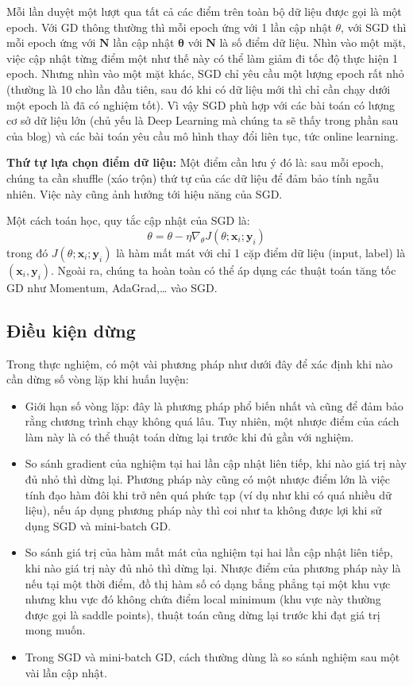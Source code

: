 Mỗi lần duyệt một lượt qua tất cả các điểm trên toàn bộ dữ liệu được gọi là một epoch. Với GD thông thường thì mỗi epoch ứng với 1 lần cập nhật $\theta$, với SGD thì mỗi epoch ứng với $\mathbf{N}$ lần cập nhật $\mathbf{\theta}$ với $\mathbf{N}$ là số điểm dữ liệu. Nhìn vào một mặt, việc cập nhật từng điểm một như thế này có thể làm giảm đi tốc độ thực hiện 1 epoch. Nhưng nhìn vào một mặt khác, SGD chỉ yêu cầu một lượng epoch rất nhỏ (thường là 10 cho lần đầu tiên, sau đó khi có dữ liệu mới thì chỉ cần chạy dưới một epoch là đã có nghiệm tốt). Vì vậy SGD phù hợp với các bài toán có lượng cơ sở dữ liệu lớn (chủ yếu là Deep Learning mà chúng ta sẽ thấy trong phần sau của blog) và các bài toán yêu cầu mô hình thay đổi liên tục, tức online learning.

\textbf{Thứ tự lựa chọn điểm dữ liệu:}
Một điểm cần lưu ý đó là: sau mỗi epoch, chúng ta cần shuffle (xáo trộn) thứ tự của các dữ liệu để đảm bảo tính ngẫu nhiên. Việc này cũng ảnh hưởng tới hiệu năng của SGD.

Một cách toán học, quy tắc cập nhật của SGD là:
$$\theta = \theta - \eta \nabla_{\theta} J(\theta; \mathbf{x}_i; \mathbf{y}_i)$$
trong đó $J(\theta; \mathbf{x}_i; \mathbf{y}_i)$ là hàm mất mát với chỉ 1 cặp điểm dữ liệu (input, label) là $(\mathbf{x}_i, \mathbf{y}_i)$. Ngoài ra, chúng ta hoàn toàn có thể áp dụng các thuật toán tăng tốc GD như Momentum, AdaGrad,… vào SGD.

\subsection{Điều kiện dừng}
Trong thực nghiệm, có một vài phương pháp như dưới đây để xác định khi nào cần dừng số vòng lặp khi huấn luyện:
\begin{itemize}
\item Giới hạn số vòng lặp: đây là phương pháp phổ biến nhất và cũng để đảm bảo rằng chương trình chạy không quá lâu. Tuy nhiên, một nhược điểm của cách làm này là có thể thuật toán dừng lại trước khi đủ gần với nghiệm.
\item So sánh gradient của nghiệm tại hai lần cập nhật liên tiếp, khi nào giá trị này đủ nhỏ thì dừng lại. Phương pháp này cũng có một nhược điểm lớn là việc tính đạo hàm đôi khi trở nên quá phức tạp (ví dụ như khi có quá nhiều dữ liệu), nếu áp dụng phương pháp này thì coi như ta không được lợi khi sử dụng SGD và mini-batch GD.
\item So sánh giá trị của hàm mất mát của nghiệm tại hai lần cập nhật liên tiếp, khi nào giá trị này đủ nhỏ thì dừng lại. Nhược điểm của phương pháp này là nếu tại một thời điểm, đồ thị hàm số có dạng bẳng phẳng tại một khu vực nhưng khu vực đó không chứa điểm local minimum (khu vực này thường được gọi là saddle points), thuật toán cũng dừng lại trước khi đạt giá trị mong muốn.
\item Trong SGD và mini-batch GD, cách thường dùng là so sánh nghiệm sau một vài lần cập nhật.
\end{itemize}


